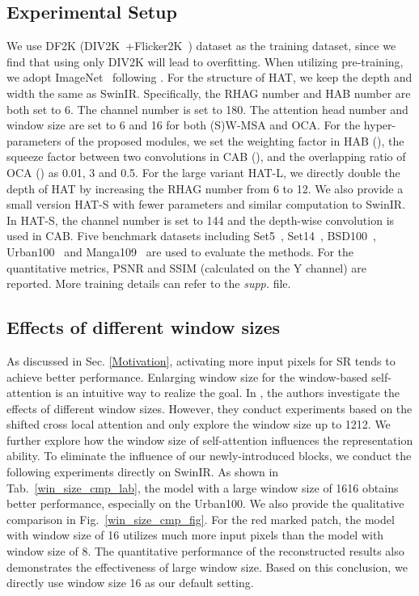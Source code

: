 \documentclass[10pt,twocolumn,letterpaper]{article}
\begin{document}
\subsection{Experimental Setup}
We use DF2K (DIV2K~\cite{div2k}+Flicker2K~\cite{flicker2k}) dataset as the training dataset, since we find that using only DIV2K will lead to overfitting. When utilizing pre-training, we adopt ImageNet~\cite{imagenet} following \cite{ipt,edt}. For the structure of HAT, we keep the depth and width the same as SwinIR. Specifically, the RHAG number and HAB number are both set to 6. The channel number is set to 180. The attention head number and window size are set to 6 and 16 for both (S)W-MSA and OCA. For the hyper-parameters of the proposed modules, we set the weighting factor in HAB (), the squeeze factor between two convolutions in CAB (), and the overlapping ratio of OCA () as 0.01, 3 and 0.5. For the large variant HAT-L, we directly double the depth of HAT by increasing the RHAG number from 6 to 12. We also provide a small version HAT-S with fewer parameters and similar computation to SwinIR. In HAT-S, the channel number is set to 144 and the depth-wise convolution is used in CAB. Five benchmark datasets including Set5~\cite{set5}, Set14~\cite{set14}, BSD100~\cite{bsd100}, Urban100~\cite{urban100} and Manga109~\cite{manga109} are used to evaluate the methods. For the quantitative metrics, PSNR and SSIM (calculated on the Y channel) are reported. More training details can refer to the \textit{supp.} file.

\subsection{Effects of different window sizes}
\label{cmp_win_size}
As discussed in Sec. \ref{Motivation}, activating more input pixels for SR tends to achieve better performance. 
Enlarging window size for the window-based self-attention is an intuitive way to realize the goal.
In \cite{edt}, the authors investigate the effects of different window sizes. However, they conduct experiments based on the shifted cross local attention and only explore the window size up to 1212. We further explore how the window size of self-attention influences the representation ability. To eliminate the influence of our newly-introduced blocks, we conduct the following experiments directly on SwinIR. As shown in Tab.~\ref{win_size_cmp_lab}, the model with a large window size of 1616 obtains better performance, especially on the Urban100. We also provide the qualitative comparison in Fig.~\ref{win_size_cmp_fig}. For the red marked patch, the model with window size of 16 utilizes much more input pixels than the model with window size of 8. The quantitative performance of the reconstructed results also demonstrates the effectiveness of large window size. Based on this conclusion, we directly use window size 16 as our default setting. 
\end{document}
